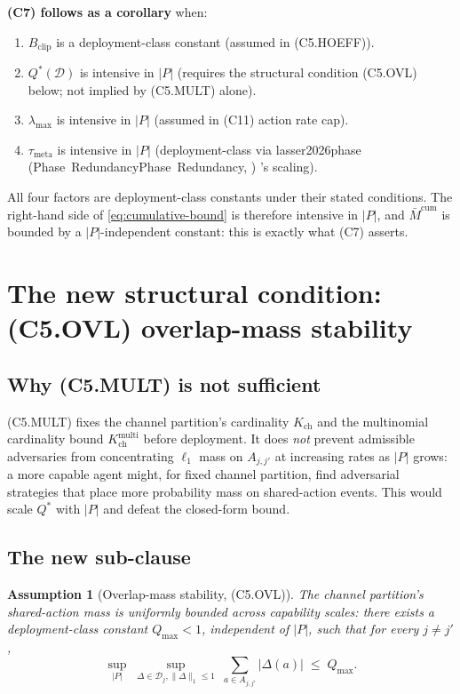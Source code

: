 \documentclass{article}
\makeatletter
\newcommand{\citep}[2][]{%
  \begingroup
  \def\@tmpkey{#2}%
  \ifx\@tmpkey\@empty\else
    (\ifx\@empty#1\@empty\else #1, \fi
     \@nameuse{bibkey@\@tmpkey})%
  \fi
  \endgroup
}
\newtheorem{assumption}{Assumption}
\newcommand{\Bclip}{B_{\mathrm{clip}}}
\newcommand{\Kch}{K_{\mathrm{ch}}}
\newcommand{\lammax}{\lambda_{\max}}
\newcommand{\taumeta}{\tau_{\mathrm{meta}}}
\newcommand{\Kchmulti}{K_{\mathrm{ch}}^{\mathrm{multi}}}
\makeatother
\begin{document}
\textbf{(C7) follows as a corollary} when:
\begin{enumerate}
\item $\Bclip$ is a deployment-class constant (assumed in
  (C5.HOEFF)).
\item $Q^*(\mathcal{D})$ is intensive in $|P|$ (requires the
  structural condition (C5.OVL) below; not implied by (C5.MULT)
  alone).
\item $\lammax$ is intensive in $|P|$ (assumed in (C11) action
  rate cap).
\item $\taumeta$ is intensive in $|P|$ (deployment-class via
  \citep[Phase~Redundancy]{lasser2026phase}'s scaling).
\end{enumerate}

All four factors are deployment-class constants under their stated
conditions.  The right-hand side of \eqref{eq:cumulative-bound} is
therefore intensive in $|P|$, and $\bar{M}^{\mathrm{cum}}$ is
bounded by a $|P|$-independent constant: this is exactly what (C7)
asserts.

\section{The new structural condition: (C5.OVL) overlap-mass stability}

\subsection{Why (C5.MULT) is not sufficient}

(C5.MULT) fixes the channel partition's cardinality $\Kch$ and the
multinomial cardinality bound $\Kchmulti$ before deployment.  It
does \emph{not} prevent admissible adversaries from concentrating
$\ell_1$ mass on $A_{j, j'}$ at increasing rates as $|P|$ grows: a
more capable agent might, for fixed channel partition, find
adversarial strategies that place more probability mass on
shared-action events.  This would scale $Q^*$ with $|P|$ and
defeat the closed-form bound.

\subsection{The new sub-clause}

\begin{assumption}[Overlap-mass stability, (C5.OVL)]
\label{ass:c5-ovl}
The channel partition's shared-action mass is uniformly bounded
across capability scales: there exists a deployment-class constant
$Q_{\max} < 1$, independent of $|P|$, such that for every $j \neq
j'$,
\begin{equation}
  \sup_{|P|} \;\sup_{\Delta \in \mathcal{D}_j, \|\Delta\|_1 \leq 1}
  \;\sum_{a \in A_{j, j'}} |\Delta(a)| \;\leq\; Q_{\max}.
\end{equation}
\end{assumption}
\end{document}

